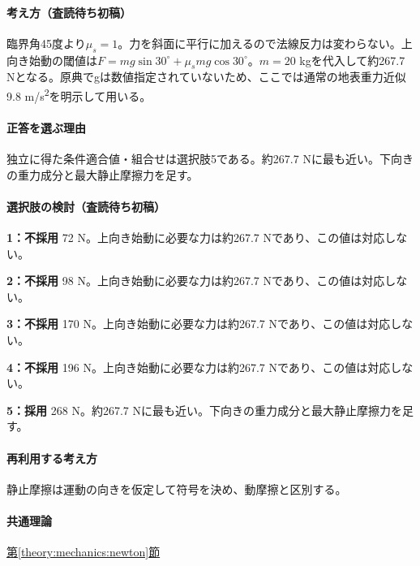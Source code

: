 \paragraph{考え方（査読待ち初稿）} 臨界角45度より\(\mu_s=1\)。力を斜面に平行に加えるので法線反力は変わらない。上向き始動の閾値は\(F=mg\sin30^\circ+\mu_smg\cos30^\circ\)。\(m=20\) kgを代入して約267.7 Nとなる。原典でgは数値指定されていないため、ここでは通常の地表重力近似9.8 m/s\textsuperscript{2}を明示して用いる。

\paragraph{正答を選ぶ理由} 独立に得た条件適合値・組合せは選択肢5である。約267.7 Nに最も近い。下向きの重力成分と最大静止摩擦力を足す。

\paragraph{選択肢の検討（査読待ち初稿）}\mbox{}\par

\noindent\textbf{1：不採用} 72 N。上向き始動に必要な力は約267.7 Nであり、この値は対応しない。\par

\noindent\textbf{2：不採用} 98 N。上向き始動に必要な力は約267.7 Nであり、この値は対応しない。\par

\noindent\textbf{3：不採用} 170 N。上向き始動に必要な力は約267.7 Nであり、この値は対応しない。\par

\noindent\textbf{4：不採用} 196 N。上向き始動に必要な力は約267.7 Nであり、この値は対応しない。\par

\noindent\textbf{5：採用} 268 N。約267.7 Nに最も近い。下向きの重力成分と最大静止摩擦力を足す。\par

\paragraph{再利用する考え方} 静止摩擦は運動の向きを仮定して符号を決め、動摩擦と区別する。

\paragraph{共通理論} \hyperref[theory:mechanics:newton]{第\ref*{theory:mechanics:newton}節}

